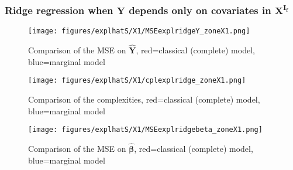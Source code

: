 \documentclass[12pt,a4paper]{report}
\begin{document}
\subsubsection{Ridge regression when $\boldsymbol{Y}$ depends only on covariates in $\boldsymbol{X^{I_f}}$}
	
\begin{figure}[h!]
	\centering
		  \texttt{[image: figures/explhatS/X1/MSEexplridgeY\_zoneX1.png]}
		\caption{Comparison of the MSE on $\hat{\boldsymbol{Y}}$, red=classical (complete) model, blue=marginal model}\label{MSEexplridgeY_zoneX1}
	\end{figure}
	\begin{figure}[h!]
	\centering
		  \texttt{[image: figures/explhatS/X1/cplexplridge\_zoneX1.png]}
		\caption{Comparison of the complexities, red=classical (complete) model, blue=marginal model}\label{cplexplridge_zoneX1}
	\end{figure}
	\begin{figure}[h!]
	\centering
		  \texttt{[image: figures/explhatS/X1/MSEexplridgebeta\_zoneX1.png]}
		\caption{Comparison of the MSE on $\hat{\boldsymbol{\beta}}$, red=classical (complete) model, blue=marginal model}\label{MSEexplridgebeta_zoneX1}
	\end{figure}
	\FloatBarrier
\end{document}
